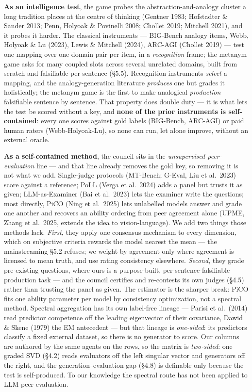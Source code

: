 \textbf{As an intelligence test}, the game probes the abstraction-and-analogy cluster a long tradition places at the centre of thinking (Gentner 1983; Hofstadter \& Sander 2013; Penn, Holyoak \& Povinelli 2008; Chollet 2019; Mitchell 2021), and it probes it harder. The classical instruments --- BIG-Bench analogy items, Webb, Holyoak \& Lu (2023), Lewis \& Mitchell (2024), ARC-AGI (Chollet 2019) --- test one mapping over one domain pair per item, in a \emph{recognition} frame; the metanym game asks for many coupled slots across several unrelated domains, built from scratch and falsifiable per sentence (§5.5). Recognition instruments \emph{select} a mapping, and the analogy-generation literature \emph{produces} one but grades it holistically; the metanym game is the first to make analogical \emph{production} falsifiable sentence by sentence. That property does double duty --- it is what lets the test be scored without a key, and \textbf{none of the prior instruments is self-contained}: every one scores against gold labels (BIG-Bench, ARC-AGI) or paid human raters (Webb-Holyoak-Lu), so none can run, let alone improve, without an external oracle.

\textbf{As a self-contained method}, the council sits in the \emph{unsupervised peer-evaluation} line --- and that line already removes the gold key, so removing it is not what we add. Single-judge protocols (MT-Bench; G-Eval, Liu et al.~2023) score against a reference; PoLL (Verga et al.~2024) adds a panel but trusts it as given; LLM-as-Examiner (Bai et al.~2023) lets the examiner write the questions; most directly, PiCO (Ning et al.~2025) lets unlabelled models answer and grade one another and recovers an ability ordering from peer agreement alone (UPME, Zhang et al.~2025, extends the idea to vision-language). We add two things those methods lack. \emph{First}, they apply one consensus mechanism to every dimension, which on subjective criteria rewards the model nearest the mean --- the mainstreaming §5.2 refuses; we weight by agreement only where agreement is licensed to mean truth, and use rating consistency elsewhere. \emph{Second}, they grade pre-existing questions, where ours is a purpose-built, per-sentence-falsifiable production task --- and the council certifies and re-contests its own judges (§4.5) rather than trusting the panel as given. The estimator is the sharper break: PiCO fits one ability parameter per model by consistency optimization, not a spectral method. Spectral aggregation has its own label-free lineage --- Parisi et al.~(2014) read predictor competence off the leading eigenvector of their covariance, Dawid \& Skene (1979) the EM antecedent --- but that lineage is \emph{one-sided}: its predictors classify a fixed external dataset, so there is no generator to score. Our columns are authored by the same agents on the rows, so the matrix is \emph{two-sided}: one graded SVD (§4.2) reads evaluators off the left singular vector and generators off the right, and the generation--evaluation gap (§4.8) is definable only because the test is self-produced. To our knowledge the spectral route has not been applied to LLM peer evaluation.

